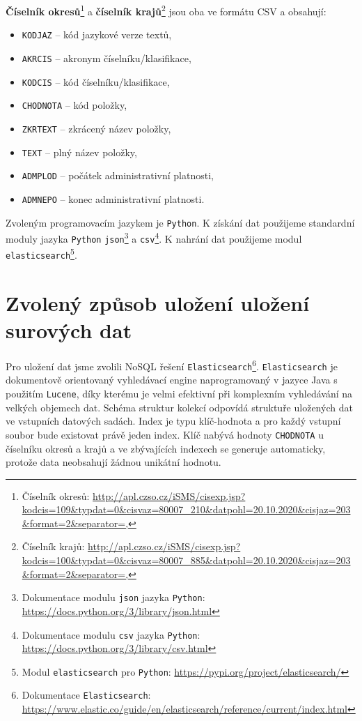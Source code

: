 \documentclass[11pt,a4paper,titlepage]{article}
\begin{document}
\textbf{Číselník okresů}\footnote{Číselník okresů: \url{http://apl.czso.cz/iSMS/cisexp.jsp?kodcis=109&typdat=0&cisvaz=80007_210&datpohl=20.10.2020&cisjaz=203&format=2&separator=,}} a \textbf{číselník krajů}\footnote{Číselník krajů: \url{http://apl.czso.cz/iSMS/cisexp.jsp?kodcis=100&typdat=0&cisvaz=80007_885&datpohl=20.10.2020&cisjaz=203&format=2&separator=,}} jsou oba ve formátu CSV a obsahují:
\begin{itemize}
    \setlength\itemsep{0.3em}
    \item \texttt{KODJAZ} -- kód jazykové verze textů,
    \item \texttt{AKRCIS} -- akronym číselníku/klasifikace,
    \item \texttt{KODCIS} -- kód číselníku/klasifikace,
    \item \texttt{CHODNOTA} -- kód položky,
    \item \texttt{ZKRTEXT} -- zkrácený název položky,
    \item \texttt{TEXT} -- plný název položky,
    \item \texttt{ADMPLOD} -- počátek administrativní platnosti,
    \item \texttt{ADMNEPO} -- konec administrativní platnosti.
\end{itemize}

Zvoleným programovacím jazykem je \texttt{Python}\cite{python}. K získání dat použijeme standardní moduly jazyka \texttt{Python}\cite{python} 
\texttt{json}\footnote{Dokumentace modulu \texttt{json} jazyka \texttt{Python}\cite{python}: \url{https://docs.python.org/3/library/json.html}} a
\texttt{csv}\footnote{Dokumentace modulu \texttt{csv} jazyka \texttt{Python}\cite{python}: \url{https://docs.python.org/3/library/csv.html}}. K nahrání dat použijeme modul \texttt{elasticsearch}\footnote{Modul \texttt{elasticsearch} pro \texttt{Python}: \url{https://pypi.org/project/elasticsearch/}}.

\section{Zvolený způsob uložení uložení surových dat}

Pro uložení dat jsme zvolili NoSQL řešení \texttt{Elasticsearch}\cite{elastic}\footnote{Dokumentace \texttt{Elasticsearch}\cite{elastic}: \url{https://www.elastic.co/guide/en/elasticsearch/reference/current/index.html}}. \texttt{Elasticsearch} je dokumentově orientovaný vyhledávací engine naprogramovaný v jazyce Java s použitím \texttt{Lucene}\cite{lucene}, díky kterému je velmi efektivní při komplexním vyhledávání na velkých objemech dat. Schéma struktur kolekcí odpovídá struktuře uložených dat ve vstupních datových sadách. Index je typu klíč-hodnota a pro každý vstupní soubor bude existovat právě jeden index. Klíč nabývá hodnoty \texttt{CHODNOTA} u číselníku okresů a krajů a ve zbývajících indexech se generuje automaticky, protože data neobsahují žádnou unikátní hodnotu.
\end{document}
